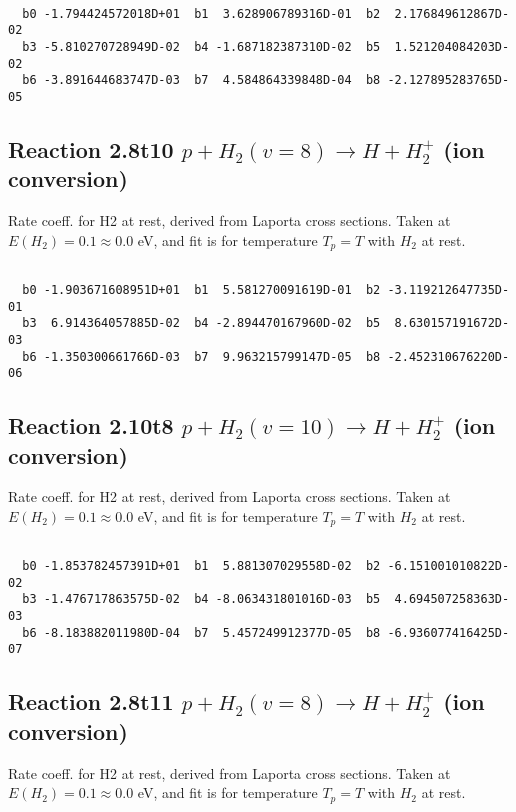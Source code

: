 \begin{small}\begin{verbatim}

  b0 -1.794424572018D+01  b1  3.628906789316D-01  b2  2.176849612867D-02
  b3 -5.810270728949D-02  b4 -1.687182387310D-02  b5  1.521204084203D-02
  b6 -3.891644683747D-03  b7  4.584864339848D-04  b8 -2.127895283765D-05

\end{verbatim}\end{small}

\newpage
\subsection{
Reaction 2.8t10
$ p + H_2(v=8) \rightarrow H + H_2^+$ (ion conversion)
}
Rate coeff. for H2 at rest, derived from Laporta cross sections.
Taken at $E(H_2) = 0.1 \approx 0.0$ eV,  and fit is for temperature $T_p=T$ with $H_2$ at rest.

\begin{small}\begin{verbatim}

  b0 -1.903671608951D+01  b1  5.581270091619D-01  b2 -3.119212647735D-01
  b3  6.914364057885D-02  b4 -2.894470167960D-02  b5  8.630157191672D-03
  b6 -1.350300661766D-03  b7  9.963215799147D-05  b8 -2.452310676220D-06

\end{verbatim}\end{small}

\newpage
\subsection{
Reaction 2.10t8
$ p + H_2(v=10) \rightarrow H + H_2^+$ (ion conversion)
}
Rate coeff. for H2 at rest, derived from Laporta cross sections.
Taken at $E(H_2) = 0.1 \approx 0.0$ eV,  and fit is for temperature $T_p=T$ with $H_2$ at rest.

\begin{small}\begin{verbatim}

  b0 -1.853782457391D+01  b1  5.881307029558D-02  b2 -6.151001010822D-02
  b3 -1.476717863575D-02  b4 -8.063431801016D-03  b5  4.694507258363D-03
  b6 -8.183882011980D-04  b7  5.457249912377D-05  b8 -6.936077416425D-07

\end{verbatim}\end{small}

\newpage
\subsection{
Reaction 2.8t11
$ p + H_2(v=8) \rightarrow H + H_2^+$ (ion conversion)
}
Rate coeff. for H2 at rest, derived from Laporta cross sections.
Taken at $E(H_2) = 0.1 \approx 0.0$ eV,  and fit is for temperature $T_p=T$ with $H_2$ at rest.

